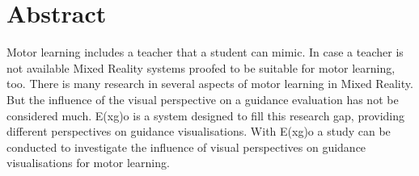 \chapter*{Abstract}
Motor learning includes a teacher that a student can mimic. In case a teacher is not available Mixed Reality systems proofed to be suitable for motor learning, too. There is many research in several aspects of motor learning in Mixed Reality. But the influence of the visual perspective on a guidance evaluation has not be considered much. E(x\textbar g)o is a system designed to fill this research gap, providing different perspectives on guidance visualisations. With E(x\textbar g)o a study can be conducted to investigate the influence of visual perspectives on guidance visualisations for motor learning.